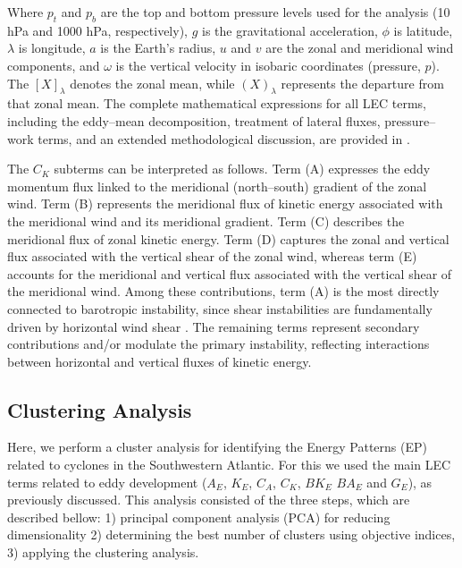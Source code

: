 \documentclass[pdflatex,sn-chicago]{sn-jnl}%
\theoremstyle{plain}
\theoremstyle{definition}
\theoremstyle{remark}
\theoremstyle{definition}
\begin{document}
Where \(p_t\) and \(p_b\) are the top and bottom pressure levels used for the analysis (10 hPa and 1000 hPa, respectively), \(g\) is the gravitational acceleration, \(\phi\) is latitude, \(\lambda\) is longitude, \(a\) is the Earth’s radius, \(u\) and \(v\) are the zonal and meridional wind components, and \(\omega\) is the vertical velocity in isobaric coordinates (pressure, \(p\)). The \([X]_{\lambda}\) denotes the zonal mean, while \((X)_{\lambda}\) represents the departure from that zonal mean. The complete mathematical expressions for all LEC terms, including the eddy–mean decomposition, treatment of lateral fluxes, pressure–work terms, and an extended methodological discussion, are provided in \citet{de2025lorenz}.

The $C_K$ subterms can be interpreted as follows. Term (A) expresses the eddy momentum flux linked to the meridional (north--south) gradient of the zonal wind. Term (B) represents the meridional flux of kinetic energy associated with the meridional wind and its meridional gradient. Term (C) describes the meridional flux of zonal kinetic energy. Term (D) captures the zonal and vertical flux associated with the vertical shear of the zonal wind, whereas term (E) accounts for the meridional and vertical flux associated with the vertical shear of the meridional wind. Among these contributions, term (A) is the most directly connected to barotropic instability, since shear instabilities are fundamentally driven by horizontal wind shear \citep{rayleigh1895stability,kuo1949dynamic,chen1985note,mak1989local,yokota2012tropical,read2020baroclinic}. The remaining terms represent secondary contributions and/or modulate the primary instability, reflecting interactions between horizontal and vertical fluxes of kinetic energy.

\subsection{Clustering Analysis}

Here, we perform a cluster analysis for identifying the Energy Patterns (EP) related to cyclones in the Southwestern Atlantic. For this we used the main LEC terms related to eddy development ($A_E$, $K_E$, $C_A$, $C_K$, $BK_E$ $BA_E$ and $G_E$), as previously discussed. This analysis consisted of the three steps, which are described bellow: 1) principal component analysis (PCA) for reducing dimensionality 2) determining the best number of clusters using objective indices, 3) applying the clustering analysis.
\end{document}
